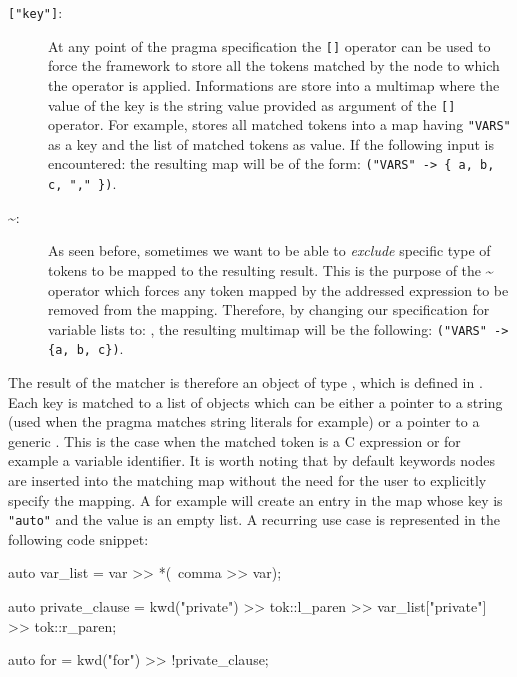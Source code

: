 \begin{description}
\item [{\tt["key"]}:] At any point of the pragma specification the {\tt []}
operator can be used to force the framework to store all the tokens matched by
the node to which the operator is applied. Informations are store into a
multimap where the value of the key is the string value provided as argument of
the {\tt []} operator. 
For example,  stores all matched
tokens into a map having {\tt "VARS"} as a key and the list of matched tokens as
value. If the following input is encountered:  the resulting
map will be of the form: {\tt ("VARS" -> \{ a, b, c, "," \})}. 

\item [\~{}:] As seen before, sometimes we want to be able to {\em exclude}
specific type of tokens to be mapped to the resulting result. This is the
purpose of the \~{} operator which forces any token mapped by the addressed
expression to be removed from the mapping. Therefore, by changing our
specification for variable lists to: , the resulting multimap will be the following:  {\tt ("VARS" ->
\{a, b, c\})}.

\end{description}

The result of the matcher is therefore an object of type
, which is defined in
. Each key is matched to a list of objects which
can be either a pointer to a string (used when the pragma matches string
literals for example) or a pointer to a generic . This is the
case when the matched token is a C expression or for example a variable
identifier. It is worth noting that by default keywords nodes are inserted into
the matching map without the need for the user to explicitly specify the
mapping. A  for example will create an entry in the map
whose key is {\tt "auto"} and the value is an empty list. A recurring use case
is represented in the following code snippet:

\begin{srcCode}
auto var_list = var >> *(~comma >> var);

auto private_clause = 
	kwd("private") >> tok::l_paren >> var_list["private"] >> tok::r_paren;

auto for = 
	kwd("for") >> !private_clause;
\end{srcCode}

